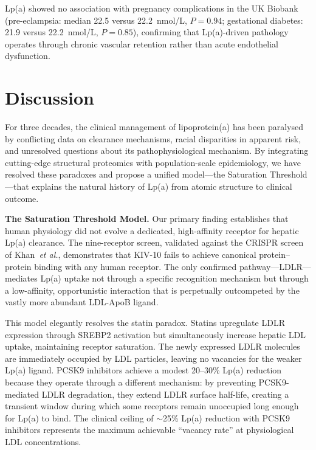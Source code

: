 \documentclass[11pt,a4paper]{article}
\newcommand{\lpa}{Lp(a)}
\newcommand{\kiv}{KIV-10}
\newcommand{\ukb}{UK Biobank}
\begin{document}
\lpa{} showed no association with pregnancy complications in the \ukb{} (pre-eclampsia: median 22.5 versus 22.2~nmol/L, $P = 0.94$; gestational diabetes: 21.9 versus 22.2~nmol/L, $P = 0.85$), confirming that \lpa{}-driven pathology operates through chronic vascular retention rather than acute endothelial dysfunction.

\section*{Discussion}

For three decades, the clinical management of lipoprotein(a) has been paralysed by conflicting data on clearance mechanisms, racial disparities in apparent risk, and unresolved questions about its pathophysiological mechanism. By integrating cutting-edge structural proteomics with population-scale epidemiology, we have resolved these paradoxes and propose a unified model---the Saturation Threshold---that explains the natural history of \lpa{} from atomic structure to clinical outcome.

\textbf{The Saturation Threshold Model.} Our primary finding establishes that human physiology did not evolve a dedicated, high-affinity receptor for hepatic \lpa{} clearance. The nine-receptor screen, validated against the CRISPR screen of Khan~\textit{et al.}\cite{khan2025}, demonstrates that \kiv{} fails to achieve canonical protein--protein binding with any human receptor. The only confirmed pathway---LDLR---mediates \lpa{} uptake not through a specific recognition mechanism but through a low-affinity, opportunistic interaction that is perpetually outcompeted by the vastly more abundant LDL-ApoB ligand.

This model elegantly resolves the statin paradox. Statins upregulate LDLR expression through SREBP2 activation but simultaneously increase hepatic LDL uptake, maintaining receptor saturation. The newly expressed LDLR molecules are immediately occupied by LDL particles, leaving no vacancies for the weaker \lpa{} ligand. PCSK9 inhibitors achieve a modest 20--30\% \lpa{} reduction because they operate through a different mechanism: by preventing PCSK9-mediated LDLR degradation, they extend LDLR surface half-life, creating a transient window during which some receptors remain unoccupied long enough for \lpa{} to bind\cite{oconnor2015}. The clinical ceiling of $\sim$25\% \lpa{} reduction with PCSK9 inhibitors represents the maximum achievable ``vacancy rate'' at physiological LDL concentrations.
\end{document}
